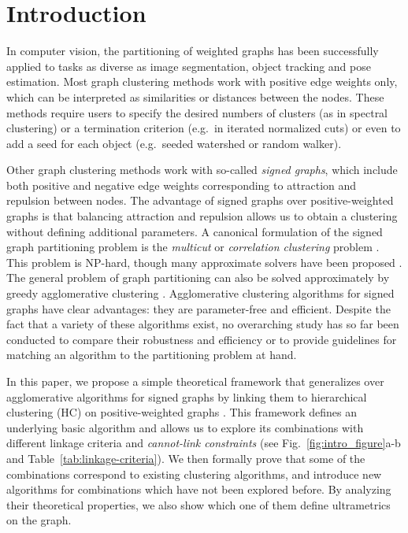 \section{Introduction}
In computer vision, the partitioning of weighted graphs has been successfully applied to tasks as diverse as image segmentation, object tracking and pose estimation. 
Most graph clustering methods work with positive edge weights only, which can be interpreted as similarities or distances between the nodes. These methods require users to specify the desired numbers of clusters (as in spectral clustering) or a termination criterion (e.g.\ in iterated normalized cuts) or even to add a seed for each object  (e.g.\ seeded watershed or random walker).  

Other graph clustering methods work with so-called \emph{signed graphs}, which include both positive and negative edge weights corresponding to attraction and repulsion between nodes. The advantage of signed graphs over positive-weighted graphs is that balancing attraction and repulsion allows us to obtain a clustering without defining additional parameters. A canonical formulation of the signed graph partitioning problem is the \emph{multicut} or \emph{correlation clustering} problem \cite{kappes2011globally,chopra1991multiway}. This problem is NP-hard, though many approximate solvers have been proposed \cite{lange2018combinatorial,pape2017solving,beier2016efficient,yarkony2012fast}. The general problem of graph partitioning can also be solved approximately by greedy agglomerative clustering \cite{keuper2015efficient,levinkov2017comparative,wolf2018mutex,kardoostsolving}. 
Agglomerative clustering algorithms for signed graphs have clear advantages: they are parameter-free and efficient. Despite the fact that a variety of these algorithms exist, no overarching study has so far been conducted to compare their robustness and efficiency or to provide guidelines for matching an algorithm to the partitioning problem at hand. 


In this paper, we propose a simple theoretical framework that generalizes over agglomerative algorithms for signed graphs by linking them to hierarchical clustering (HC) on positive-weighted graphs \cite{lance1967general}. This framework defines an underlying basic algorithm and allows us to explore its combinations with different linkage criteria and \emph{cannot-link constraints} (see Fig.~\ref{fig:intro_figure}a-b and Table~\ref{tab:linkage-criteria}). 
We then formally prove that some of the combinations correspond to existing clustering algorithms, and introduce new algorithms for combinations which have not been explored before. By analyzing their theoretical properties, we also show which one of them define ultrametrics on the graph.

